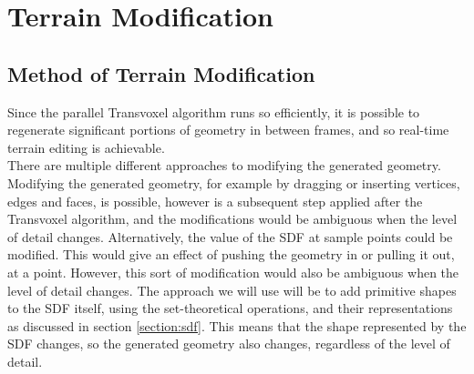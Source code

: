 \documentclass{article}
\begin{document}
\section{Terrain Modification}
\subsection{Method of Terrain Modification}
Since the parallel Transvoxel algorithm runs so efficiently, it is possible to regenerate significant portions of geometry in between frames, and so real-time terrain editing is achievable.\\
There are multiple different approaches to modifying the generated geometry. Modifying the generated geometry, for example by dragging or inserting vertices, edges and faces, is possible, however is a subsequent step applied after the Transvoxel algorithm, and the modifications would be ambiguous when the level of detail changes. Alternatively, the value of the SDF at sample points could be modified. This would give an effect of pushing the geometry in or pulling it out, at a point. However, this sort of modification would also be ambiguous when the level of detail changes. The approach we will use will be to add primitive shapes to the SDF itself, using the set-theoretical operations, and their representations as discussed in section \ref{section:sdf}. This means that the shape represented by the SDF changes, so the generated geometry also changes, regardless of the level of detail.
\end{document}

